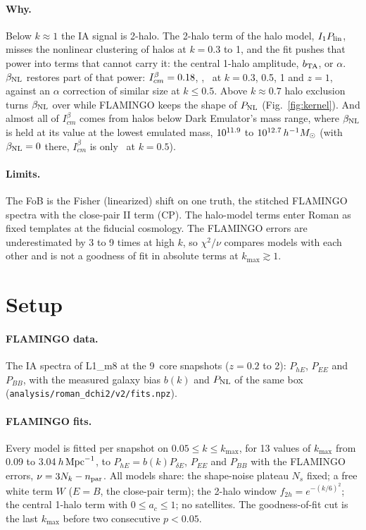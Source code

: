 \documentclass[11pt]{article}
\newcommand{\hMpc}{\,h\,{\rm Mpc}^{-1}}
\newcommand{\Msun}{\,h^{-1}M_\odot}
\newcommand{\Plin}{P_{\rm lin}}
\newcommand{\PNL}{P_{\rm NL}}
\newcommand{\bTA}{b_{\rm TA}}
\newcommand{\bNL}{\beta_{\rm NL}}
\newcommand{\Ib}[1]{I^{\beta}_{#1}}
\newcommand{\kmax}{k_{\max}}
\newcommand{\Kmin}{0.05}           %
\newcommand{\Ktwoh}{6}             %
\newcommand{\NsnapCore}{9}         %
\begin{document}
\paragraph{Why.}
Below $k \approx 1$ the IA signal is 2-halo. The 2-halo term of the halo
model, $I_1\Plin$, misses the nonlinear clustering of halos at
$k = 0.3$ to 1, and the fit pushes that power into terms that cannot carry
it: the central 1-halo amplitude, $\bTA$, or $\alpha$. $\bNL$ restores part of
that power: $\Ib{cm} = \ibcmB$, \ibcmC, \ibcmD\ at $k = 0.3$, 0.5, 1 and
$z = 1$, against an $\alpha$ correction of similar size at $k \le 0.5$. Above
$k \approx 0.7$ halo exclusion turns $\bNL$ over while FLAMINGO keeps the
shape of $\PNL$ (Fig.~\ref{fig:kernel}). And almost all of $\Ib{cm}$ comes
from halos below Dark Emulator's mass range, where $\bNL$ is held at its value
at the lowest emulated mass, $10^{11.9}$ to $10^{\lgMEhi}\Msun$ (with
$\bNL = 0$ there, $\Ib{cm}$ is only \ibcmLoC\ at $k = 0.5$).

\paragraph{Limits.}
The FoB is the Fisher (linearized) shift on one truth, the stitched FLAMINGO
spectra with the close-pair II term (CP). The halo-model terms enter Roman as
fixed templates at the fiducial cosmology. The FLAMINGO errors are
underestimated by 3 to 9 times at high $k$, so $\chi^2/\nu$ compares models
with each other and is not a goodness of fit in absolute terms at
$\kmax \gtrsim 1$.

\section{Setup}
\label{sec:setup}

\paragraph{FLAMINGO data.} The IA spectra of L1\_m8 at the \NsnapCore\ core
snapshots ($z = 0.2$ to 2): $P_{hE}$, $P_{EE}$ and $P_{BB}$, with the measured
galaxy bias $b(k)$ and $\PNL$ of the same box
(\texttt{analysis/roman\_dchi2/v2/fits.npz}).

\paragraph{FLAMINGO fits.} Every model is fitted per snapshot on
$\Kmin \le k \le \kmax$, for 13 values of $\kmax$ from 0.09 to 3.04$\hMpc$,
to $P_{hE} = b(k)P_{\delta E}$, $P_{EE}$ and $P_{BB}$ with the FLAMINGO
errors, $\nu = 3N_k - n_{\rm par}$. All models share: the shape-noise
plateau $N_s$ fixed; a free white term $W$ ($E = B$, the close-pair term);
the 2-halo window $f_{2h} = e^{-(k/\Ktwoh)^2}$; the central 1-halo term with
$0 \le a_c \le 1$; no satellites. The goodness-of-fit cut is the last
$\kmax$ before two consecutive $p < 0.05$.
\end{document}
